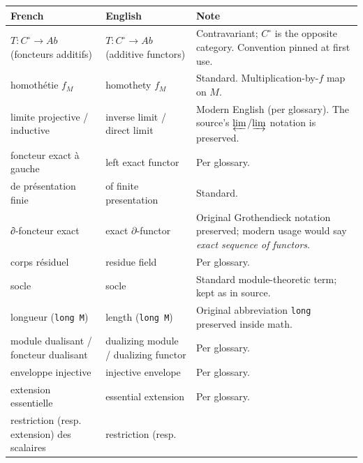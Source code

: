 \documentclass[
  11pt,
  a4paper,
]{book}
\newcounter{none} %
\begin{document}
{\def\LTcaptype{none} %
\begin{longtable}[]{@{}
  >{\raggedright\arraybackslash}p{}
  >{\raggedright\arraybackslash}p{}
  >{\raggedright\arraybackslash}p{}@{}}
\toprule\noalign{}
\begin{minipage}[b]{\linewidth}\raggedright
French
\end{minipage} & \begin{minipage}[b]{\linewidth}\raggedright
English
\end{minipage} & \begin{minipage}[b]{\linewidth}\raggedright
Note
\end{minipage} \\
\midrule\noalign{}
\endhead
\bottomrule\noalign{}
\endlastfoot
\(T : C^{\circ} \to Ab\) (foncteurs additifs) & \(T : C^{\circ} \to Ab\)
(additive functors) & Contravariant; \(C^{\circ}\) is the opposite
category. Convention pinned at first use. \\
homothétie \(f_{M}\) & homothety \(f_{M}\) & Standard.
Multiplication-by-\(f\) map on \(M\). \\
limite projective / inductive & inverse limit / direct limit & Modern
English (per glossary). The source's \(\varprojlim\)/\(\varinjlim\)
notation is preserved. \\
foncteur exact à gauche & left exact functor & Per glossary. \\
de présentation finie & of finite presentation & Standard. \\
∂-foncteur exact & exact \(\partial\)-functor & Original Grothendieck
notation preserved; modern usage would say \emph{exact sequence of
functors}. \\
corps résiduel & residue field & Per glossary. \\
socle & socle & Standard module-theoretic term; kept as in source. \\
longueur (\texttt{long\ M}) & length (\texttt{long\ M}) & Original
abbreviation \texttt{long} preserved inside math. \\
module dualisant / foncteur dualisant & dualizing module / dualizing
functor & Per glossary. \\
enveloppe injective & injective envelope & Per glossary. \\
extension essentielle & essential extension & Per glossary. \\
restriction (resp. extension) des scalaires & restriction (resp.

\end{longtable}}
\end{document}
